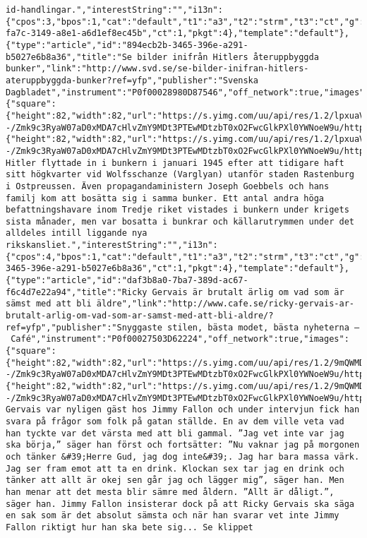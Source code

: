 \begin{verbatim}
id-handlingar.","interestString":"","i13n":{"cpos":3,"bpos":1,"cat":"default","t1":"a3","t2":"strm","t3":"ct","g":"ef2b9127-fa7c-3149-a8e1-a6d1ef8ec45b","ct":1,"pkgt":4},"template":"default"},{"type":"article","id":"894ecb2b-3465-396e-a291-b5027e6b8a36","title":"Se bilder inifrån Hitlers återuppbyggda bunker","link":"http://www.svd.se/se-bilder-inifran-hitlers-ateruppbyggda-bunker?ref=yfp","publisher":"Svenska Dagbladet","instrument":"P0f00028980D87546","off_network":true,"images":{"square":{"height":82,"width":82,"url":"https://s.yimg.com/uu/api/res/1.2/lpxuaVqNT_qFWmhTYJ0Nzg--/Zmk9c3RyaW07aD0xMDA7cHlvZmY9MDt3PTEwMDtzbT0xO2FwcGlkPXl0YWNoeW9u/http://slingstone.zenfs.com/offnetwork/eb9e0e881d9e70307bf8a3d956941a52","defer":1}},"image":{"height":82,"width":82,"url":"https://s.yimg.com/uu/api/res/1.2/lpxuaVqNT_qFWmhTYJ0Nzg--/Zmk9c3RyaW07aD0xMDA7cHlvZmY9MDt3PTEwMDtzbT0xO2FwcGlkPXl0YWNoeW9u/http://slingstone.zenfs.com/offnetwork/eb9e0e881d9e70307bf8a3d956941a52","defer":1},"summary":"Adolf Hitler flyttade in i bunkern i januari 1945 efter att tidigare haft sitt högkvarter vid Wolfsschanze (Varglyan) utanför staden Rastenburg i Ostpreussen. Även propagandaministern Joseph Goebbels och hans familj kom att bosätta sig i samma bunker. Ett antal andra höga befattningshavare inom Tredje riket vistades i bunkern under krigets sista månader, men var bosatta i bunkrar och källarutrymmen under det alldeles intill liggande nya rikskansliet.","interestString":"","i13n":{"cpos":4,"bpos":1,"cat":"default","t1":"a3","t2":"strm","t3":"ct","g":"894ecb2b-3465-396e-a291-b5027e6b8a36","ct":1,"pkgt":4},"template":"default"},{"type":"article","id":"daf3b8a0-7ba7-389d-ac67-f6c4d7e22a94","title":"Ricky Gervais är brutalt ärlig om vad som är sämst med att bli äldre","link":"http://www.cafe.se/ricky-gervais-ar-brutalt-arlig-om-vad-som-ar-samst-med-att-bli-aldre/?ref=yfp","publisher":"Snyggaste stilen, bästa modet, bästa nyheterna – Café","instrument":"P0f00027503D62224","off_network":true,"images":{"square":{"height":82,"width":82,"url":"https://s.yimg.com/uu/api/res/1.2/9mQWMDUhkTBMdOlAkzkFFw--/Zmk9c3RyaW07aD0xMDA7cHlvZmY9MDt3PTEwMDtzbT0xO2FwcGlkPXl0YWNoeW9u/http://slingstone.zenfs.com/offnetwork/f01885d94408f7d70418b06d6421f206","defer":1}},"image":{"height":82,"width":82,"url":"https://s.yimg.com/uu/api/res/1.2/9mQWMDUhkTBMdOlAkzkFFw--/Zmk9c3RyaW07aD0xMDA7cHlvZmY9MDt3PTEwMDtzbT0xO2FwcGlkPXl0YWNoeW9u/http://slingstone.zenfs.com/offnetwork/f01885d94408f7d70418b06d6421f206","defer":1},"summary":"Ricky Gervais var nyligen gäst hos Jimmy Fallon och under intervjun fick han svara på frågor som folk på gatan ställde. En av dem ville veta vad han tyckte var det värsta med att bli gammal. ”Jag vet inte var jag ska börja,” säger han först och fortsätter: ”Nu vaknar jag på morgonen och tänker &#39;Herre Gud, jag dog inte&#39;. Jag har bara massa värk. Jag ser fram emot att ta en drink. Klockan sex tar jag en drink och tänker att allt är okej sen går jag och lägger mig”, säger han. Men han menar att det mesta blir sämre med åldern. ”Allt är dåligt.”, säger han. Jimmy Fallon insisterar dock på att Ricky Gervais ska säga en sak som är det absolut sämsta och när han svarar vet inte Jimmy Fallon riktigt hur han ska bete sig... Se klippet 
\end{verbatim}
